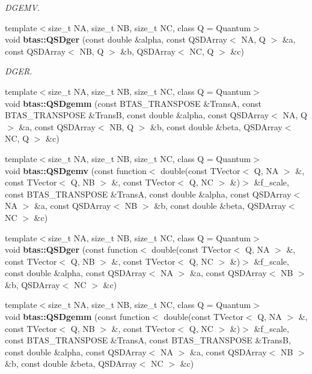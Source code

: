 \begin{DoxyCompactItemize}
\begin{DoxyCompactList}\small\item\em D\-G\-E\-M\-V. \end{DoxyCompactList}\item 
{\footnotesize template$<$size\-\_\-t N\-A, size\-\_\-t N\-B, size\-\_\-t N\-C, class Q  = Quantum$>$ }\\void {\bf btas\-::\-Q\-S\-Dger} (const double \&alpha, const Q\-S\-D\-Array$<$ N\-A, Q $>$ \&a, const Q\-S\-D\-Array$<$ N\-B, Q $>$ \&b, Q\-S\-D\-Array$<$ N\-C, Q $>$ \&c)
\begin{DoxyCompactList}\small\item\em D\-G\-E\-R. \end{DoxyCompactList}\item 
{\footnotesize template$<$size\-\_\-t N\-A, size\-\_\-t N\-B, size\-\_\-t N\-C, class Q  = Quantum$>$ }\\void {\bf btas\-::\-Q\-S\-Dgemm} (const B\-T\-A\-S\-\_\-\-T\-R\-A\-N\-S\-P\-O\-S\-E \&Trans\-A, const B\-T\-A\-S\-\_\-\-T\-R\-A\-N\-S\-P\-O\-S\-E \&Trans\-B, const double \&alpha, const Q\-S\-D\-Array$<$ N\-A, Q $>$ \&a, const Q\-S\-D\-Array$<$ N\-B, Q $>$ \&b, const double \&beta, Q\-S\-D\-Array$<$ N\-C, Q $>$ \&c)
\item 
{\footnotesize template$<$size\-\_\-t N\-A, size\-\_\-t N\-B, size\-\_\-t N\-C, class Q  = Quantum$>$ }\\void {\bf btas\-::\-Q\-S\-Dgemv} (const function$<$ double(const T\-Vector$<$ Q, N\-A $>$ \&, const T\-Vector$<$ Q, N\-B $>$ \&, const T\-Vector$<$ Q, N\-C $>$ \&)$>$ \&f\-\_\-scale, const B\-T\-A\-S\-\_\-\-T\-R\-A\-N\-S\-P\-O\-S\-E \&Trans\-A, const double \&alpha, const Q\-S\-D\-Array$<$ N\-A $>$ \&a, const Q\-S\-D\-Array$<$ N\-B $>$ \&b, const double \&beta, Q\-S\-D\-Array$<$ N\-C $>$ \&c)
\item 
{\footnotesize template$<$size\-\_\-t N\-A, size\-\_\-t N\-B, size\-\_\-t N\-C, class Q  = Quantum$>$ }\\void {\bf btas\-::\-Q\-S\-Dger} (const function$<$ double(const T\-Vector$<$ Q, N\-A $>$ \&, const T\-Vector$<$ Q, N\-B $>$ \&, const T\-Vector$<$ Q, N\-C $>$ \&)$>$ \&f\-\_\-scale, const double \&alpha, const Q\-S\-D\-Array$<$ N\-A $>$ \&a, const Q\-S\-D\-Array$<$ N\-B $>$ \&b, Q\-S\-D\-Array$<$ N\-C $>$ \&c)
\item 
{\footnotesize template$<$size\-\_\-t N\-A, size\-\_\-t N\-B, size\-\_\-t N\-C, class Q  = Quantum$>$ }\\void {\bf btas\-::\-Q\-S\-Dgemm} (const function$<$ double(const T\-Vector$<$ Q, N\-A $>$ \&, const T\-Vector$<$ Q, N\-B $>$ \&, const T\-Vector$<$ Q, N\-C $>$ \&)$>$ \&f\-\_\-scale, const B\-T\-A\-S\-\_\-\-T\-R\-A\-N\-S\-P\-O\-S\-E \&Trans\-A, const B\-T\-A\-S\-\_\-\-T\-R\-A\-N\-S\-P\-O\-S\-E \&Trans\-B, const double \&alpha, const Q\-S\-D\-Array$<$ N\-A $>$ \&a, const Q\-S\-D\-Array$<$ N\-B $>$ \&b, const double \&beta, Q\-S\-D\-Array$<$ N\-C $>$ \&c)

\end{DoxyCompactItemize}
